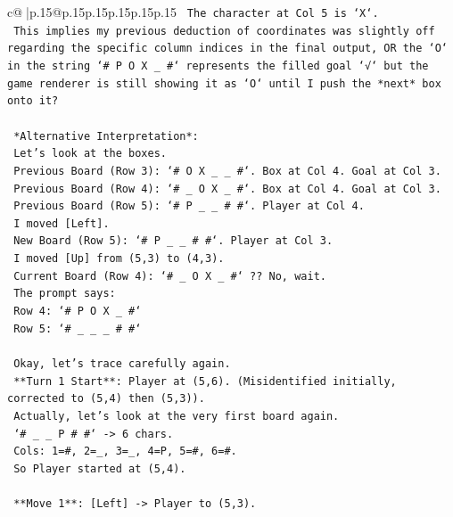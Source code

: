 \documentclass{article}
\begin{document}
{\begin{supertabular}{c@{$\;$}|p{.15\linewidth}@{}p{.15\linewidth}p{.15\linewidth}p{.15\linewidth}p{.15\linewidth}p{.15\linewidth}}
{{{\texttt{            The character at Col 5 is `X`.} \\
\texttt{            This implies my previous deduction of coordinates was slightly off regarding the specific column indices in the final output, OR the `O` in the string `\# P O X \_ \#` represents the filled goal `√` but the game renderer is still showing it as `O` until I push the *next* box onto it?} \\
\\ 
\texttt{            *Alternative Interpretation*:} \\
\texttt{            Let's look at the boxes.} \\
\texttt{            Previous Board (Row 3): `\# O X \_ \_ \#`. Box at Col 4. Goal at Col 3.} \\
\texttt{            Previous Board (Row 4): `\# \_ O X \_ \#`. Box at Col 4. Goal at Col 3.} \\
\texttt{            Previous Board (Row 5): `\# P \_ \_ \# \#`. Player at Col 4.} \\
\texttt{            I moved {[}Left{]}.} \\
\texttt{            New Board (Row 5): `\# P \_ \_ \# \#`. Player at Col 3.} \\
\texttt{            I moved {[}Up{]} from (5,3) to (4,3).} \\
\texttt{            Current Board (Row 4): `\# \_ O X \_ \#` ?? No, wait.} \\
\texttt{            The prompt says:} \\
\texttt{            Row 4: `\# P O X \_ \#`} \\
\texttt{            Row 5: `\# \_ \_ \_ \# \#`} \\
\\ 
\texttt{            Okay, let's trace carefully again.} \\
\texttt{            **Turn 1 Start**: Player at (5,6). (Misidentified initially, corrected to (5,4) then (5,3)).} \\
\texttt{            Actually, let's look at the very first board again.} \\
\texttt{            `\# \_ \_ P \# \#` {-}> 6 chars.} \\
\texttt{            Cols: 1=\#, 2=\_, 3=\_, 4=P, 5=\#, 6=\#.} \\
\texttt{            So Player started at (5,4).} \\
\\ 
\texttt{            **Move 1**: {[}Left{]} {-}> Player to (5,3).} \\
}}}
\end{supertabular}}
\end{document}
